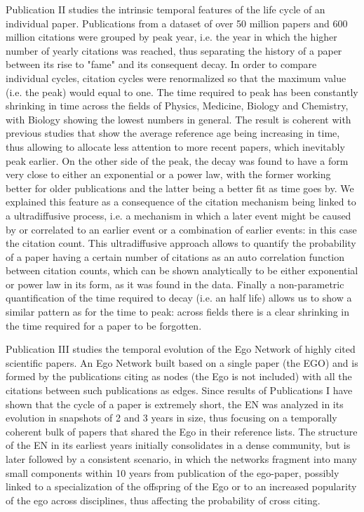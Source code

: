 Publication II studies the intrinsic temporal features of the life cycle of an individual paper. Publications from a dataset of over 50 million papers and 600 million
citations were grouped by peak year, i.e. the year in which the higher number of yearly citations was reached, thus separating the history of a paper between its rise to
"fame" and its consequent decay. In order to compare individual cycles, citation cycles were renormalized so that the maximum value (i.e. the peak) would equal to one. The time required
to peak has been constantly shrinking in time across the fields of Physics, Medicine, Biology and Chemistry, with Biology showing the lowest numbers in general. The result is coherent
with previous studies that show the average reference age being increasing in time, thus allowing to allocate less attention to more recent papers, which inevitably peak earlier. On the other
side of the peak, the decay was found to have a form very close to either an exponential or a power law, with the former working better for older publications and the latter
being a better fit as time goes by. We explained this feature as a consequence of the citation mechanism being linked to a ultradiffusive process, i.e. a mechanism in which a later event might be caused by or correlated to an earlier event
or a combination of earlier events: in this case the citation count. This ultradiffusive approach allows to quantify the probability of a paper having a certain number 
of citations as an auto correlation function between citation counts, which can be shown analytically to be either exponential or power law in its form, as it was found in the data. Finally
a non-parametric quantification of the time required to decay (i.e. an half life) allows us to show a similar pattern as for the time to peak: across fields there is a clear
shrinking in the time required for a paper to be forgotten. 

Publication III studies the temporal evolution of the Ego Network of highly cited scientific papers. An Ego Network built based on a single paper (the EGO) and is formed
by the publications citing as nodes (the Ego is not included) with all the citations between such publications as edges. Since results of Publications I have shown
that the cycle of a paper is extremely short, the EN was analyzed in its evolution in snapshots of 2 and 3 years in size, thus focusing on a temporally coherent bulk of papers that shared
the Ego in their reference lists. The structure of the EN in its earliest years initially consolidates in a dense community, but is later followed by a consistent
scenario, in which the networks fragment into many small components within 10 years from publication of the
ego-paper, possibly linked to a specialization of the offspring of the Ego or to an increased popularity of the ego across disciplines, thus affecting the probability of cross citing.

